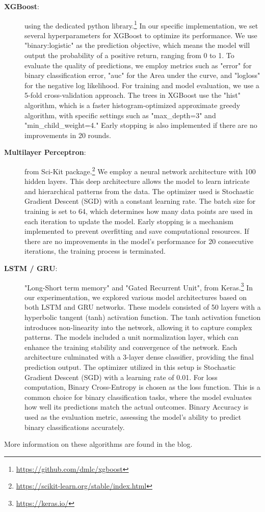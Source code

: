 \documentclass[10pt]{article} %
\begin{document}
\begin{description}
  \item[\textbf{XGBoost}:] using the dedicated python library.\footnote{\href{https://github.com/dmlc/xgboost}{https://github.com/dmlc/xgboost}} In our specific implementation, we set several hyperparameters for XGBoost to optimize its performance. We use "binary:logistic" as the prediction objective, which means the model will output the probability of a positive return, ranging from 0 to 1. To evaluate the quality of predictions, we employ metrics such as "error" for binary classification error, "auc" for the Area under the curve, and "logloss" for the negative log likelihood. For training and model evaluation, we use a 5-fold cross-validation approach. The trees in XGBoost use the "hist" algorithm, which is a faster histogram-optimized approximate greedy algorithm, with specific settings such as "max\_depth=3" and "min\_child\_weight=4." Early stopping is also implemented if there are no improvements in 20 rounds.
  
  \item[\textbf{Multilayer Perceptron}:] from Sci-Kit package.\footnote{\href{https://scikit-learn.org/stable/index.html}{https://scikit-learn.org/stable/index.html}} We employ a neural network architecture with 100 hidden layers. This deep architecture allows the model to learn intricate and hierarchical patterns from the data. The optimizer used is Stochastic Gradient Descent (SGD) with a constant learning rate. The batch size for training is set to 64, which determines how many data points are used in each iteration to update the model. Early stopping is a mechanism implemented to prevent overfitting and save computational resources. If there are no improvements in the model's performance for 20 consecutive iterations, the training process is terminated.
  
  \item [\textbf{LSTM / GRU}:] "Long-Short term memory" and "Gated Recurrent Unit", from Keras.\footnote{\href{https://keras.io/}{https://keras.io/}} In our experimentation, we explored various model architectures based on both LSTM and GRU networks. These models consisted of 50 layers with a hyperbolic tangent (tanh) activation function. The tanh activation function introduces non-linearity into the network, allowing it to capture complex patterns. The models included a unit normalization layer, which can enhance the training stability and convergence of the network. Each architecture culminated with a 3-layer dense classifier, providing the final prediction output. The optimizer utilized in this setup is Stochastic Gradient Descent (SGD) with a learning rate of 0.01. For loss computation, Binary Cross-Entropy is chosen as the loss function. This is a common choice for binary classification tasks, where the model evaluates how well its predictions match the actual outcomes. Binary Accuracy is used as the evaluation metric, assessing the model's ability to predict binary classifications accurately.

\end{description}
More information on these algorithms are found in the blog.
\end{document}
